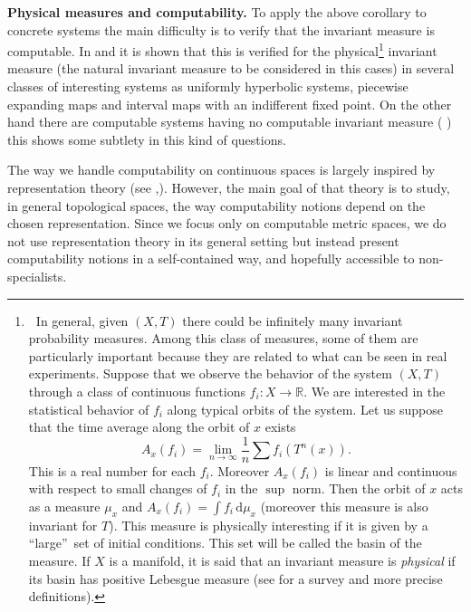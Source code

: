 \documentclass[copyright,creativecommons]{eptcs}
\numberwithin{equation}{section}
\begin{document}
\noindent \textbf{Physical measures and computability. }To apply the above
corollary to concrete systems the main difficulty is to verify that the
invariant measure is computable. In \cite{GHR07} and \cite{GalHoyRoj3} it is
shown that this is verified for the physical\footnote{\textbf{\ }In general,
given $(X,T)$ there could be infinitely many invariant probability measures.
Among this class of measures, some of them are particularly important
because they are related to what can be seen in real experiments. Suppose
that we observe the behavior of the system $(X,T)$ through a class of
continuous functions $f_{i}:X\rightarrow \mathbb{R}$. We are interested in
the statistical behavior of $f_{i}$ along typical orbits of the system. Let
us suppose that the time average along the orbit of $x$ exists
\begin{equation*}
A_{x}(f_{i})=\underset{n\rightarrow \infty }{\lim }\frac{1}{n}\sum
f_{i}(T^{n}(x)).
\end{equation*}This is a real number for each $f_{i}.$ Moreover $A_{x}(f_{i})$ is linear
and continuous with respect to small changes of $f_{i}$ in the $\sup $ norm.
Then the orbit of $x$ acts as a measure $\mu _{x}$ and $A_{x}(f_{i})=\int \!{f_{i}}\,\mathrm{d}{\mu }_{x}$ (moreover this measure is also invariant for $T $). This measure is physically interesting if it is given by a
\textquotedblleft large\textquotedblright\ set of initial conditions. This
set will be called the basin of the measure. If $X$ is a manifold, it is
said that an invariant measure is \emph{physical} if its basin has positive
Lebesgue measure (see \cite{Y} for a survey and more precise definitions).}
invariant measure (the natural invariant measure to be considered in this
cases) in several classes of interesting systems as uniformly hyperbolic
systems, piecewise expanding maps and interval maps with an indifferent
fixed point. On the other hand there are computable systems having no
computable invariant measure ( \cite{GalHoyRoj3}) this shows some subtlety in this kind of
questions.

The way we handle computability on continuous spaces is largely inspired by
representation theory (see \cite{Wei00},\cite{BHW}). However, the main goal
of that theory is to study, in general topological spaces, the way
computability notions depend on the chosen representation. Since we focus
only on computable metric spaces, we do not use representation theory in its
general setting but instead present computability notions in a
self-contained way, and hopefully accessible to non-specialists.
\end{document}

